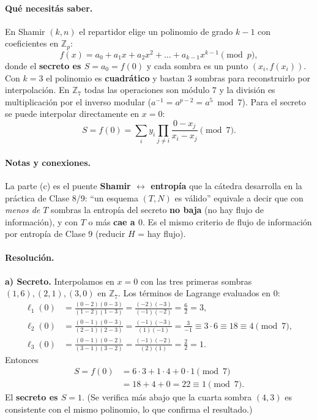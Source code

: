 \paragraph{Qué necesitás saber.}
En Shamir $(k,n)$ el repartidor elige un polinomio de grado $k-1$ con coeficientes en
$\mathbb{Z}_p$:
\begin{equation*}
  f(x) = a_0 + a_1 x + a_2 x^2 + \dots + a_{k-1}x^{k-1} \pmod p,
\end{equation*}
donde el \textbf{secreto es $S = a_0 = f(0)$} y cada sombra es un punto $(x_i, f(x_i))$. Con
$k=3$ el polinomio es \textbf{cuadrático} y bastan $3$ sombras para reconstruirlo por
interpolación. En $\mathbb{Z}_7$ todas las operaciones son módulo $7$ y la división es
multiplicación por el inverso modular ($a^{-1} = a^{p-2} = a^5 \bmod 7$). Para el secreto se
puede interpolar directamente en $x=0$:
\begin{equation*}
  S = f(0) = \sum_{i} y_i \prod_{j\neq i} \frac{0 - x_j}{x_i - x_j} \pmod 7 .
\end{equation*}

\paragraph{Notas y conexiones.}
La parte (c) es el puente \textbf{Shamir $\leftrightarrow$ entropía} que la cátedra desarrolla
en la práctica de Clase 8/9: ``un esquema $(T,N)$ es válido'' equivale a decir que con
\emph{menos de $T$} sombras la entropía del secreto \textbf{no baja} (no hay flujo de
información), y con $T$ o más \textbf{cae a $0$}. Es el mismo criterio de flujo de información
por entropía de Clase 9 (reducir $H$ = hay flujo).

\paragraph{Resolución.}

\textbf{a) Secreto.} Interpolamos en $x=0$ con las tres primeras sombras
$(1,6),(2,1),(3,0)$ en $\mathbb{Z}_7$. Los términos de Lagrange evaluados en $0$:
\begin{align*}
  \ell_1(0) &= \frac{(0-2)(0-3)}{(1-2)(1-3)} = \frac{(-2)(-3)}{(-1)(-2)} = \frac{6}{2} = 3,\\
  \ell_2(0) &= \frac{(0-1)(0-3)}{(2-1)(2-3)} = \frac{(-1)(-3)}{(1)(-1)} = \frac{3}{-1}
              \equiv 3\cdot 6 \equiv 18 \equiv 4 \pmod 7,\\
  \ell_3(0) &= \frac{(0-1)(0-2)}{(3-1)(3-2)} = \frac{(-1)(-2)}{(2)(1)} = \frac{2}{2} = 1.
\end{align*}
Entonces
\begin{align*}
  S = f(0) &= 6\cdot 3 + 1\cdot 4 + 0\cdot 1 \pmod 7 \\
           &= 18 + 4 + 0 = 22 \equiv \boxed{1} \pmod 7 .
\end{align*}
El \textbf{secreto es $S = 1$}. (Se verifica más abajo que la cuarta sombra $(4,3)$ es
consistente con el mismo polinomio, lo que confirma el resultado.)

